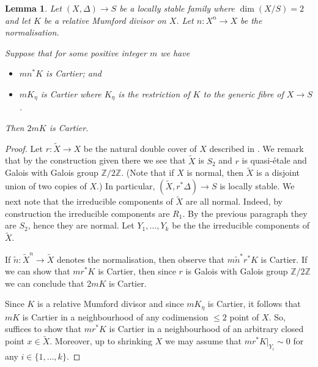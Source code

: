 \documentclass[12pt, a4paper]{amsart}
\newtheorem{lemma}[theorem]{Lemma}
\theoremstyle{definition}
\theoremstyle{named}
\begin{document}
\begin{lemma}
\label{lem_index_on_normalisation}
Let $(X, \Delta) \to S$ be a locally stable family where $\dim (X/S) = 2$ and let $K$ be a relative Mumford divisor on $X$.
Let $n\colon X^n \to X$ be the normalisation.

Suppose that for some positive integer $m$ we have
\begin{itemize}
\item $mn^*K$ is Cartier; and 
\item $mK_{\eta}$ is Cartier where $K_\eta$ is the restriction of $K$ to the generic fibre of $X \to S$.
\end{itemize}
Then $2mK$ is Cartier.
\end{lemma}
\begin{proof}
Let $r\colon \tilde{X} \rightarrow X$ be the natural double cover 
    of $X$ described in \cite[\S 5.23]{Kollar13}.  We remark
    that by the construction given there we see that $\tilde{X}$
    is $S_2$ and $r$ is quasi-\'etale and Galois with Galois group $\mathbb Z/2\mathbb Z$.
    (Note that if $X$ is normal, then $\tilde{X}$ is a disjoint union of two copies of $X$.)
    In particular, $(\tilde{X}, r^*\Delta) \to S$ is locally stable.  We next note that the irreducible components of $\tilde{X}$ are all normal.
    Indeed, by construction the irreducible components are $R_1$.  By the previous paragraph they are  $S_2$, hence they are normal.
    Let $Y_1, \dots, Y_k$ be the the irreducible components of $\tilde{X}$.  
    
    If $\tilde{n}\colon \tilde{X}^n \to \tilde{X}$ denotes the normalisation, then observe that $m\tilde{n}^*r^*K$ is Cartier.
    If we can show that $mr^*K$ is Cartier, then since $r$ is Galois with Galois group $\mathbb Z/2\mathbb Z$ we can conclude 
    that $2mK$ is Cartier.

Since $K$ is a relative Mumford divisor and since $mK_\eta$ is Cartier, it follows that $mK$ is Cartier in a neighbourhood of any codimension $\le 2$ point of $X$.  So, suffices to show that $mr^*K$ is Cartier in a neighbourhood of
an arbitrary closed point $x \in \tilde{X}$.
Moreover, up to shrinking $X$ we may assume that $mr^*K|_{Y_i} \sim 0$ for any $i \in \{1, \dots, k\}$.


\end{proof}
\end{document}
